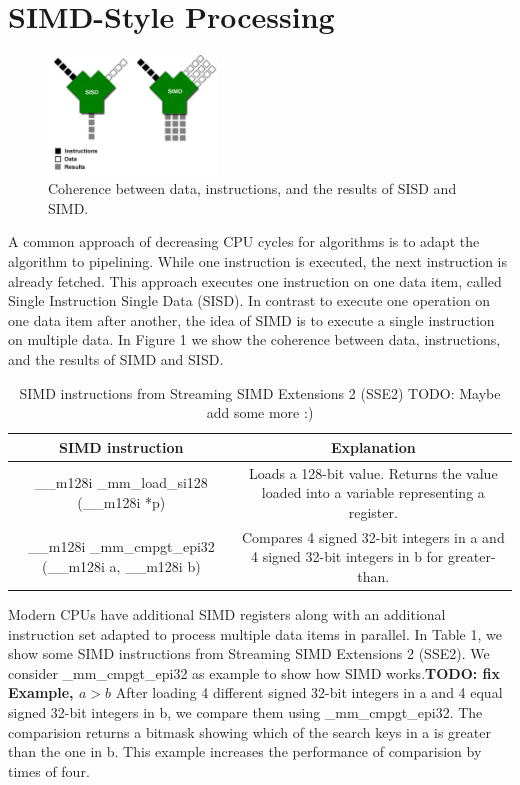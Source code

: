 \documentclass[conference]{IEEEtran}
\begin{document}
\section{SIMD-Style Processing}
\begin{figure}
	\includegraphics[width=0.4\textwidth]{figure_1.png}
	\caption{Coherence between data, instructions, and the results of SISD and SIMD.}
	\label{fig}
\end{figure}
A common approach of decreasing CPU cycles for algorithms is to adapt the algorithm to pipelining. While one instruction is executed, the next instruction is already fetched. This approach executes one instruction on one data item, called Single Instruction Single Data (SISD). In contrast to execute one operation on one data item after another, the idea of SIMD is to execute a single instruction on multiple data. In Figure 1 we show the coherence between data, instructions, and the results of SIMD and SISD. 
\begin{table}[htbp]
	\caption{SIMD instructions from Streaming SIMD Extensions 2 (SSE2) TODO: Maybe add some more :)}
	\begin{center}
		\begin{tabular}{|c|c|}
			\hline
			\textbf{SIMD instruction}&\textbf{Explanation}\\
			\hline
			\_\_m128i \_mm\_load\_si128 (\_\_m128i *p) & Loads a 128-bit value. Returns the value loaded into a variable representing a register.\\
			\_\_m128i \_mm\_cmpgt\_epi32 (\_\_m128i a, \_\_m128i b) & Compares 4 signed 32-bit integers in a and 4 signed 32-bit integers
			in b for greater-than.\\
			\hline
		\end{tabular}
		\label{tab1}
	\end{center}
\end{table}
Modern CPUs have additional SIMD registers along with an additional instruction set adapted to process multiple data items in parallel. In Table 1, we show some SIMD instructions from Streaming SIMD Extensions 2 (SSE2). We consider \_mm\_cmpgt\_epi32 as example to show how SIMD works.\textbf{TODO: fix Example, $a > b$} After loading 4 different signed 32-bit integers in a and 4 equal signed 32-bit integers in b, we compare them using \_mm\_cmpgt\_epi32. The comparision returns a bitmask showing which of the search keys in a is greater than the one in b. This example increases the performance of comparision by times of four. 
\end{document}
